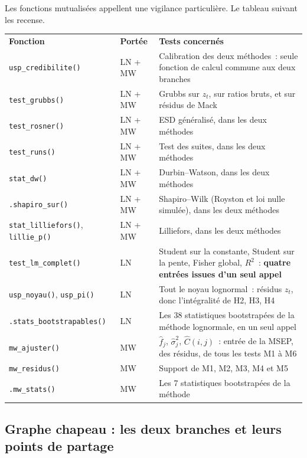 \documentclass[a4paper,11pt]{article}
\newcommand{\code}[1]{\texttt{\small #1}}
\begin{document}
\medskip
\noindent
Les fonctions mutualisées appellent une vigilance particulière. Le tableau
suivant les recense.

\begin{center}
\small
{}
\begin{tabular}{@{}p{4.4cm}p{1.9cm}p{8.5cm}@{}}
\rowcolor{tableheader}
\textcolor{financeblue}{\textbf{Fonction}} &
\textcolor{financeblue}{\textbf{Portée}} &
\textcolor{financeblue}{\textbf{Tests concernés}} \\
\code{usp\_credibilite()} & LN + MW & Calibration des deux méthodes~: seule
fonction de calcul commune aux deux branches \\
\code{test\_grubbs()} & LN + MW & Grubbs sur $z_t$, sur ratios bruts, et sur
résidus de Mack \\
\code{test\_rosner()} & LN + MW & ESD généralisé, dans les deux méthodes \\
\code{test\_runs()} & LN + MW & Test des suites, dans les deux méthodes \\
\code{stat\_dw()} & LN + MW & Durbin--Watson, dans les deux méthodes \\
\code{.shapiro\_sur()} & LN + MW & Shapiro--Wilk (Royston et loi nulle simulée),
dans les deux méthodes \\
\code{stat\_lilliefors()}, \code{lillie\_p()} & LN + MW & Lilliefors, dans les
deux méthodes \\
\code{test\_lm\_complet()} & LN & Student sur la constante, Student sur la
pente, Fisher global, $R^2$~: \textbf{quatre entrées issues d'un seul appel} \\
\code{usp\_noyau()}, \code{usp\_pi()} & LN & Tout le noyau lognormal~:
résidus $z_t$, donc l'intégralité de H2, H3, H4 \\
\code{.stats\_bootstrapables()} & LN & Les 38 statistiques bootstrapées de la
méthode lognormale, en un seul appel \\
\code{mw\_ajuster()} & MW & $\hat f_j$, $\hat\sigma_j^2$, $\hat C(i,j)$~: entrée
de la MSEP, des résidus, de tous les tests M1 à M6 \\
\code{mw\_residus()} & MW & Support de M1, M2, M3, M4 et M5 \\
\code{.mw\_stats()} & MW & Les 7 statistiques bootstrapées de la méthode \\
\end{tabular}
\end{center}

\newpage
\subsection{Graphe chapeau : les deux branches et leurs points de partage}
\end{document}
